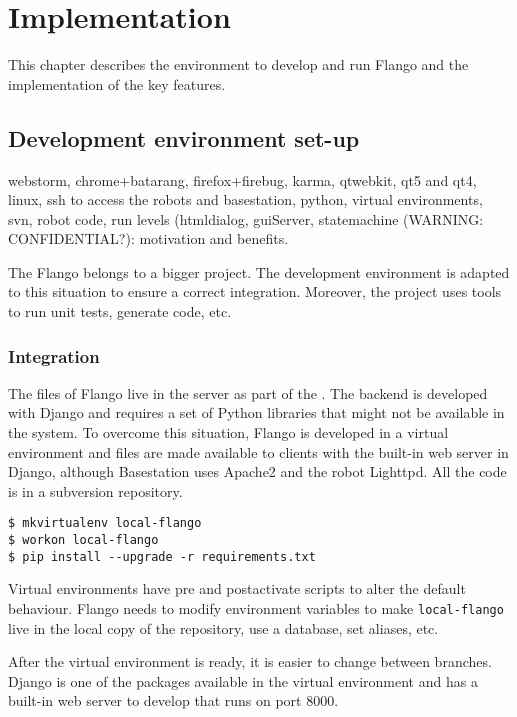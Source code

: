 \chapter{Implementation}
\cite{Stefanov} \cite{Crockford} \cite{Darwin} \cite{AngularJSGuide} 
This chapter describes the environment to develop and run Flango \cm and the implementation of the key features.

\section{Development environment set-up}
webstorm, chrome+batarang, firefox+firebug, karma, qtwebkit, qt5 and qt4, linux, ssh to access the robots and basestation, python, virtual environments, svn, robot code, run levels (htmldialog, guiServer, statemachine (WARNING: CONFIDENTIAL?): motivation and benefits.

The Flango \cm belongs to a bigger project.
The development environment is adapted to this situation to ensure a correct integration.
Moreover, the project uses tools to run unit tests, generate code, etc.

\subsection{Integration}
The files of Flango \cm live in the server as part of the \flangobe .
The backend is developed with Django and requires a set of Python libraries that might not be available in the system.
To overcome this situation, Flango is developed in a virtual environment and files are made available to clients with the built-in web server in Django, although Basestation uses Apache2 and the robot Lighttpd.
All the code is in a subversion repository.

\begin{lstlisting}[caption=lalala, label=virtual-env]
$ mkvirtualenv local-flango
$ workon local-flango
$ pip install --upgrade -r requirements.txt
\end{lstlisting}

Virtual environments have pre and postactivate scripts to alter the default behaviour.
Flango needs to modify environment variables to make \texttt{local-flango} live in the local copy of the repository, use a database, set aliases, etc.

After the virtual environment is ready, it is easier to change between branches.
Django is one of the packages available in the virtual environment and has a built-in web server to develop that runs on port 8000.

